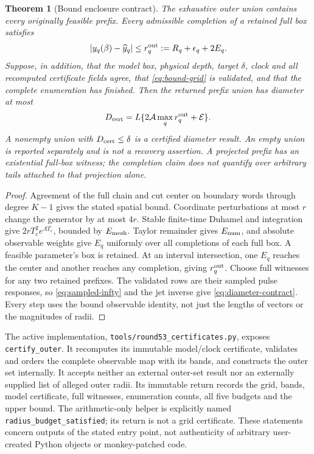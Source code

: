 \documentclass[11pt,reqno]{amsart}
\newtheorem{theorem}{Theorem}[section]
\theoremstyle{remark}\newtheorem{remark}[theorem]{Remark}
\begin{document}
\begin{theorem}[Bound enclosure contract]
\label{thm:outer}
The exhaustive outer union contains every originally feasible prefix.
Every admissible completion of a retained full box satisfies
\[
 |y_q(\beta)-\widehat y_q|\le r_q^{\rm out}:=R_q+\epsilon_q+2E_q.
\]
Suppose, in addition, that the model box, physical depth, target $\delta$,
clock and all recomputed certificate fields agree, that \eqref{eq:bound-grid}
is validated, and that the complete enumeration has finished. Then the returned
prefix union has diameter at most
\begin{equation}
 D_{\rm cert}=L\{2\mathcal A\max_q r_q^{\rm out}+\mathcal E\}.
 \label{eq:diameter-contract}
\end{equation}
A nonempty union with $D_{\rm cert}\le\delta$ is a certified diameter result.
An empty union is reported separately and is not a recovery assertion.
A projected prefix has an existential full-box witness; the completion claim
does not quantify over arbitrary tails attached to that projection alone.
\end{theorem}
\begin{proof}
Agreement of the full chain and cut center on boundary words through degree
$K-1$ gives the stated spatial bound. Coordinate perturbations at most $r$
change the generator by at most $4r$. Stable finite-time Duhamel and integration
give $2rT_c^2e^{\Lambda T_c}$, bounded by $E_{\rm mesh}$. Taylor remainder
gives $E_{\rm num}$, and absolute observable weights give $E_q$ uniformly over
all completions of each full box. A feasible parameter's box is retained.
At an interval intersection, one $E_q$ reaches the center and another reaches
any completion, giving $r_q^{\rm out}$. Choose full witnesses for any two
retained prefixes. The validated rows are their sampled pulse responses, so
\eqref{eq:sampled-infty} and the jet inverse give
\eqref{eq:diameter-contract}. Every step uses the bound observable identity,
not just the lengths of vectors or the magnitudes of radii.
\end{proof}

The active implementation, \texttt{tools/round53\_certificates.py}, exposes
\texttt{certify\_outer}. It recomputes its immutable model/clock certificate,
validates and orders the complete observable map with its bands, and constructs
the outer set internally. It accepts neither an external outer-set result nor
an externally supplied list of alleged outer radii. Its immutable return records
the grid, bands, model certificate, full witnesses, enumeration counts, all
five budgets and the upper bound. The arithmetic-only helper is explicitly
named \texttt{radius\_budget\_satisfied}; its return is not a grid certificate.
These statements concern outputs of the stated entry point, not authenticity
of arbitrary user-created Python objects or monkey-patched code.
\end{document}
